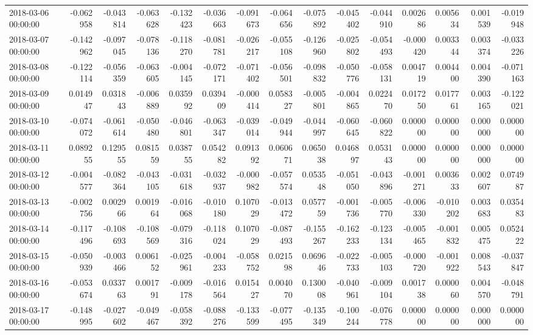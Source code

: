 \begin{tabular}{lrrrrrrrrrrrrrr}
2018-03-06 00:00:00 & -0.062958 & -0.043814 & -0.063628 & -0.132423 & -0.036663 & -0.091673 & -0.064656 & -0.075892 & -0.045402 & -0.044910 & 0.002686 & 0.005634 & 0.001539 & -0.019948 \\
2018-03-07 00:00:00 & -0.142962 & -0.097045 & -0.078136 & -0.118270 & -0.081781 & -0.026217 & -0.055108 & -0.126960 & -0.025802 & -0.054493 & -0.000420 & 0.003344 & 0.003374 & -0.033226 \\
2018-03-08 00:00:00 & -0.122114 & -0.056359 & -0.063605 & -0.004145 & -0.072171 & -0.071402 & -0.056501 & -0.098832 & -0.050776 & -0.058131 & 0.004719 & 0.004400 & 0.004390 & -0.071163 \\
2018-03-09 00:00:00 & 0.014947 & 0.031843 & -0.006889 & 0.035992 & 0.039409 & -0.000414 & 0.058327 & -0.005801 & -0.004865 & 0.022470 & 0.017250 & 0.017761 & 0.003165 & -0.122021 \\
2018-03-10 00:00:00 & -0.074072 & -0.061614 & -0.050480 & -0.046801 & -0.063347 & -0.039014 & -0.049944 & -0.044997 & -0.060645 & -0.060822 & 0.000000 & 0.000000 & 0.000000 & 0.000000 \\
2018-03-11 00:00:00 & 0.089255 & 0.129555 & 0.081559 & 0.038755 & 0.054282 & 0.091392 & 0.060671 & 0.065038 & 0.046897 & 0.053143 & 0.000000 & 0.000000 & 0.000000 & 0.000000 \\
2018-03-12 00:00:00 & -0.004577 & -0.082364 & -0.043105 & -0.031618 & -0.032937 & -0.000982 & -0.057574 & 0.053548 & -0.051050 & -0.043896 & -0.001271 & 0.003633 & 0.002607 & 0.074987 \\
2018-03-13 00:00:00 & -0.002756 & 0.002966 & 0.001964 & -0.016068 & -0.010180 & 0.107029 & -0.013472 & 0.057759 & -0.001736 & -0.005770 & -0.006330 & -0.010202 & 0.003683 & 0.035483 \\
2018-03-14 00:00:00 & -0.117496 & -0.108693 & -0.108569 & -0.079316 & -0.118024 & 0.107029 & -0.087493 & -0.155267 & -0.162233 & -0.123134 & -0.005465 & -0.001832 & 0.005475 & 0.052422 \\
2018-03-15 00:00:00 & -0.050939 & -0.003466 & 0.006152 & -0.025961 & -0.004233 & -0.058752 & 0.021598 & 0.069646 & -0.022733 & -0.005103 & -0.000720 & -0.001922 & 0.008543 & -0.037847 \\
2018-03-16 00:00:00 & -0.053674 & 0.033763 & 0.001791 & -0.009178 & -0.016564 & 0.015427 & 0.004070 & 0.130008 & -0.040961 & -0.009104 & 0.001738 & 0.000060 & 0.004570 & -0.048791 \\
2018-03-17 00:00:00 & -0.148995 & -0.027602 & -0.049467 & -0.058392 & -0.088276 & -0.133599 & -0.077495 & -0.135349 & -0.100244 & -0.076778 & 0.000000 & 0.000000 & 0.000000 & 0.000000 \\

\end{tabular}
